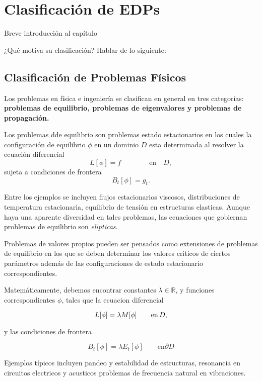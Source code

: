 \chapter{Clasificación de EDPs}\label{cap:clasificación}

Breve introducción al capítulo

¿Qué motiva su clasificación? Hablar de lo siguiente:

\section{Clasificación de Problemas Físicos}

Los problemas en física e ingeniería se clasifican en general en tres categorías: \textbf{problemas de equilibrio, problemas de eigenvalores y problemas de propagación.}

Los problemas dde equilibrio son problemas estado estacionarios en los cuales la configuración de equilibrio $\phi$ en un dominio $D$ esta determinada al resolver la ecuación diferencial
\[ L[\phi] = f \qquad \qquad \text{en} \quad D, \]
sujeta a condiciones de frontera
\[ B_t[\phi] = g_t. \]

Entre los ejemplos se incluyen flujos estacionarios viscosos, distribuciones de temperatura estacionaria, equilibrio de tensión en estructuras elasticas. Aunque  haya una aparente diversidad en tales problemas, las ecuaciones que gobiernan problemas de equilibrio son \textit{elipticas}.

Problemas de valores propios pueden ser pensados como extensiones de problemas de equilibrio en los que se deben determinar los valores criticos de ciertos parámetros además de las configuraciones de estado estacionario correspondientes.

Matemáticamente, debemos encontrar constantes $\lambda \in \mathbb{R}$, y funciones correspondientes $\phi$, tales que la ecuacion diferencial

\[ L[\phi] = \lambda M[\phi]  \qquad \text{en} \thinspace D, \]

y las condiciones de frontera

\[
B_t[\phi] = \lambda E_t[\phi]
\qquad \text{en} \partial D \]

Ejemplos típicos incluyen pandeo y estabilidad de estructuras, resonancia en circuitos electricos y acusticos problemas de frecuencia natural en vibraciones.

